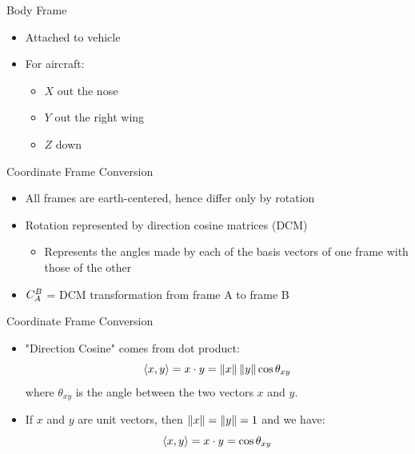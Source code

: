 \begin{frame}
Body Frame
 \begin{itemize}
 \item Attached to vehicle
 \item For aircraft:
   \begin{itemize}
    \item $X$ out the nose
    \item $Y$ out the right wing
    \item $Z$ down
   \end{itemize}
\end{itemize}
\end{frame}
\begin{frame}
Coordinate Frame Conversion
 \begin{itemize}
 \item All frames are earth-centered, hence differ only by
 rotation
 \item Rotation represented by direction cosine matrices (DCM)
 \begin{itemize}
	\item Represents the angles made by each of the basis vectors of one frame with those of the other
 \end{itemize}
 \item $C_{A}^{B}$ = DCM transformation from frame A to frame B
\end{itemize}
\end{frame}
\begin{frame}
Coordinate Frame Conversion
\begin{itemize}
  \item "Direction Cosine" comes from dot product:
\[\left<x,y\right>=x\cdot y=\left\Vert x\right\Vert\left\Vert y\right\Vert\cos\theta_{xy}\]
where $\theta_{xy}$ is the angle between the two vectors $x$ and $y$.
  \item If $x$ and $y$ are unit vectors, then $\left\Vert x\right\Vert=\left\Vert y\right\Vert=1$ and we have:
\[\left<x,y\right>=x\cdot y=\cos\theta_{xy}\]
\end{itemize} 
\end{frame}

